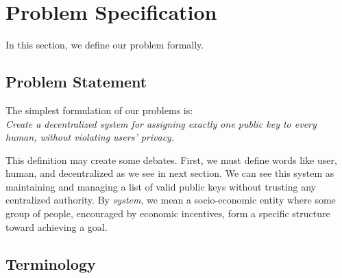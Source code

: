 \documentclass[conference]{IEEEtran}
\begin{document}


\section{ Problem Specification}
In this section, we define our problem formally.

\subsection{Problem Statement}
The simplest formulation of our problems is: \\
\textit{Create a decentralized system for assigning exactly one public key to every human, without violating users' privacy. }


This definition may create some debates. First, we must define words like user, human, and decentralized as we see in next section. We can see this system as maintaining and managing a list of valid public keys without trusting any centralized authority. By \textit{system}, we mean a socio-economic entity where some group of people, encouraged by economic incentives, form a specific structure toward achieving a goal. 

\subsection{Terminology}
\end{document}
